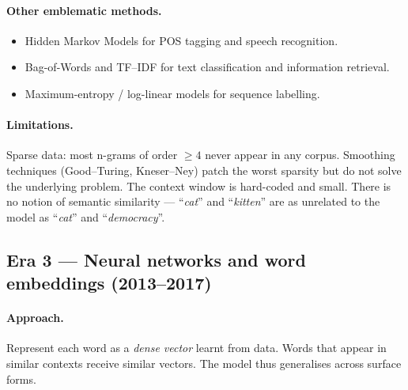 \paragraph{Other emblematic methods.}
\begin{itemize}
    \item Hidden Markov Models for POS tagging and speech recognition.
    \item Bag-of-Words and TF--IDF for text classification and information retrieval.
    \item Maximum-entropy / log-linear models for sequence labelling.
\end{itemize}

\paragraph{Limitations.} Sparse data: most n-grams of order $\geq 4$ never appear in any corpus. Smoothing techniques (Good--Turing, Kneser--Ney) patch the worst sparsity but do not solve the underlying problem. The context window is hard-coded and small. There is no notion of semantic similarity --- ``\emph{cat}'' and ``\emph{kitten}'' are as unrelated to the model as ``\emph{cat}'' and ``\emph{democracy}''.

\subsection{Era 3 --- Neural networks and word embeddings (2013--2017)}

\paragraph{Approach.} Represent each word as a \emph{dense vector} learnt from data. Words that appear in similar contexts receive similar vectors. The model thus generalises across surface forms.

